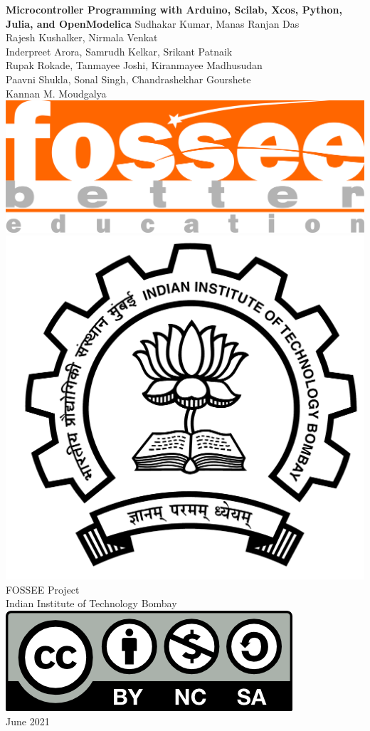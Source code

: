 \begin{center}
{\bf {\Huge Microcontroller Programming with Arduino, Scilab, Xcos,
    Python, Julia, and OpenModelica}}
\vfill
%
Sudhakar Kumar, Manas Ranjan Das \\
Rajesh Kushalker, Nirmala Venkat \\
Inderpreet Arora, Samrudh Kelkar, Srikant Patnaik \\
Rupak Rokade, Tanmayee Joshi, Kiranmayee Madhusudan \\
Paavni Shukla, Sonal Singh, Chandrashekhar Gourshete \\
Kannan M. Moudgalya \\
\vfill
\includegraphics[width=0.3\linewidth]{suppl/fossee_logo_hi.png} \quad
\includegraphics[width=0.2\linewidth]{suppl/IITB-logo-HighRes.png} \\
FOSSEE Project \\
Indian Institute of Technology Bombay \\ [2mm]
\includegraphics[width=0.15\linewidth]{suppl/by-nc-sa.png} \\ [1mm]
June 2021
\end{center}

\clearpage
